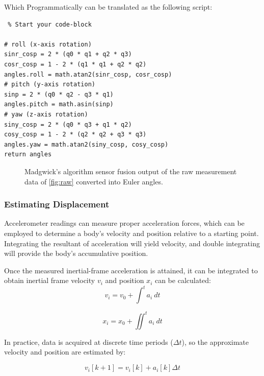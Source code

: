 Which Programmatically can be translated as the following script:

\lstset{language=Python}
\begin{lstlisting} % Start your code-block
    
# roll (x-axis rotation)
sinr_cosp = 2 * (q0 * q1 + q2 * q3)
cosr_cosp = 1 - 2 * (q1 * q1 + q2 * q2)
angles.roll = math.atan2(sinr_cosp, cosr_cosp)
# pitch (y-axis rotation)
sinp = 2 * (q0 * q2 - q3 * q1)
angles.pitch = math.asin(sinp)
# yaw (z-axis rotation)
siny_cosp = 2 * (q0 * q3 + q1 * q2)
cosy_cosp = 1 - 2 * (q2 * q2 + q3 * q3)
angles.yaw = math.atan2(siny_cosp, cosy_cosp)
return angles
\end{lstlisting}

\begin{figure}
    \centering
    \resizebox{0.8\linewidth}{!}{}
    \caption{Madgwick's algorithm sensor fusion output of the raw measurement data of  \ref{fig:raw} converted into Euler angles.}
    \label{fig:fusion_output_euler}
\end{figure}


\newpage

\subsubsection{Estimating Displacement}

Accelerometer readings can measure proper acceleration forces, which can be employed to determine a body's velocity and position relative to a starting point. Integrating the resultant of acceleration will yield velocity, and double integrating will provide the body's accumulative position.

Once the measured inertial-frame acceleration is attained, it can be integrated to obtain inertial frame velocity $v_i$  and position $x_i$ can be calculated:
\begin{equation}
    v_i = v_0 +  \int^t a_i~dt
\end{equation}

\begin{equation}
    x_i = x_0 + \iint^t a_i~dt
\end{equation}

In practice, data is acquired at discrete time periods ($\Delta t$), so the approximate velocity and position are estimated by:

\begin{equation}
    v_i[k+1]= v_i[k]+a_i[k]\Delta t
\end{equation}

